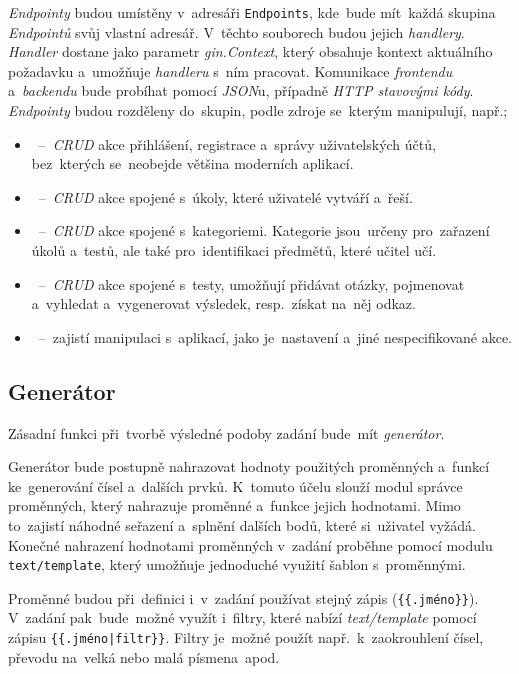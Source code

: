 \documentclass[11pt,a4paper]{report}
\newcommand{\harddata}[1]{\boxed{\texttt{#1}}}
\begin{document}
            \emph{Endpointy} budou umístěny v~adresáři \texttt{Endpoints}, kde~bude mít~každá skupina \emph{Endpointů} svůj vlastní adresář. V~těchto souborech budou jejich \emph{handlery}. \emph{Handler} dostane jako parametr \emph{gin.Context}, který obsahuje kontext aktuálního požadavku a~umožňuje \emph{handleru} s~ním pracovat. Komunikace \emph{frontendu} a~\emph{backendu} bude probíhat pomocí \emph{JSON}u, případně \emph{HTTP stavovými kódy}. \emph{Endpointy} budou rozděleny do~skupin, podle zdroje se~kterým manipulují, např.;
            \begin{itemize}
                \item \harddata{User}~--~\emph{CRUD} akce přihlášení, registrace a~správy uživatelských účtů, bez~kterých se~neobejde většina moderních aplikací.
                \item \harddata{Task}~--~\emph{CRUD} akce spojené s~úkoly, které uživatelé vytváří a~řeší.
                \item \harddata{Category}~--~\emph{CRUD} akce spojené s~kategoriemi. Kategorie jsou~určeny pro~zařazení úkolů a~testů, ale také pro~identifikaci předmětů, které učitel učí.
                \item \harddata{Test}~--~\emph{CRUD} akce spojené s~testy, umožňují přidávat otázky, pojmenovat a~vyhledat a~vygenerovat výsledek, resp.~získat na~něj odkaz.
                \item \harddata{App}~--~zajistí manipulaci s~aplikací, jako je~nastavení a~jiné nespecifikované akce.
            \end{itemize}

        \subsection{Generátor}
            Zásadní funkci při~tvorbě výsledné podoby zadání bude~mít \emph{generátor}.
            
            Generátor bude postupně nahrazovat hodnoty použitých proměnných a~funkcí ke~generování čísel a~dalších prvků. K~tomuto účelu slouží modul správce proměnných, který nahrazuje proměnné a~funkce jejich hodnotami. Mimo to~zajistí náhodné seřazení a~splnění dalších bodů, které si~uživatel vyžádá. Konečné nahrazení hodnotami proměnných v~zadání proběhne pomocí modulu \texttt{text/template}, který umožňuje jednoduché využití šablon s~proměnnými.
            
            Proměnné budou při~definici i~v~zadání používat stejný zápis (\texttt{\{\{.jméno\}\}}). V~zadání pak~bude~možné využít i~filtry, které nabízí \emph{text/template} pomocí zápisu \texttt{\{\{.jméno|filtr\}\}}. Filtry je~možné použít např.~k~zaokrouhlení čísel, převodu na~velká nebo malá písmena~apod.
\end{document}
